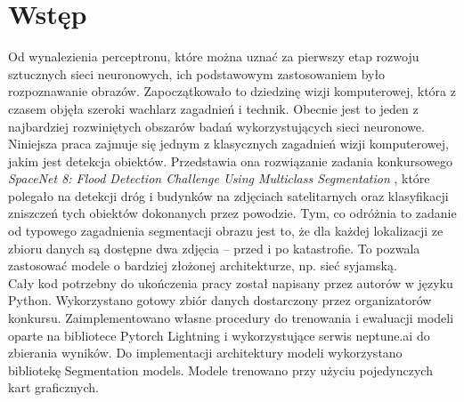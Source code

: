 \newpage %
\section{Wstęp}
Od wynalezienia perceptronu, które można uznać za pierwszy etap rozwoju sztucznych sieci neuronowych, ich podstawowym zastosowaniem było rozpoznawanie obrazów. Zapoczątkowało to dziedzinę wizji komputerowej, która z czasem objęła szeroki wachlarz zagadnień i technik. Obecnie jest to jeden z najbardziej rozwiniętych obszarów badań wykorzystujących sieci neuronowe.\\
Niniejsza praca zajmuje się jednym z klasycznych zagadnień wizji komputerowej, jakim jest detekcja obiektów. Przedstawia ona rozwiązanie zadania konkursowego \textit{SpaceNet 8: Flood Detection Challenge Using Multiclass Segmentation} \cite{spacenet8}, które polegało na detekcji dróg i budynków na zdjęciach satelitarnych oraz klasyfikacji zniszczeń tych obiektów dokonanych przez powodzie. Tym, co odróżnia to zadanie od typowego zagadnienia segmentacji obrazu jest to, że dla każdej lokalizacji ze zbioru danych są dostępne dwa zdjęcia -- przed i po katastrofie. To pozwala zastosować modele o bardziej złożonej architekturze, np. sieć syjamską.\\
Cały kod potrzebny do ukończenia pracy został napisany przez autorów w języku Python. Wykorzystano gotowy zbiór danych dostarczony przez organizatorów konkursu. Zaimplementowano własne procedury do trenowania i ewaluacji modeli oparte na bibliotece Pytorch Lightning i wykorzystujące serwis neptune.ai do zbierania wyników. Do implementacji architektury modeli wykorzystano bibliotekę Segmentation models. Modele trenowano przy użyciu pojedynczych kart graficznych.
